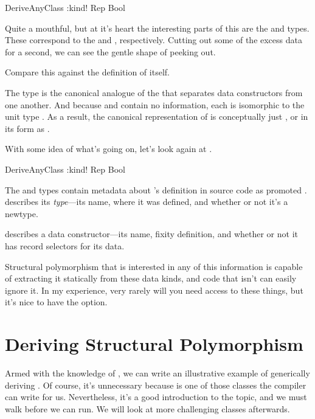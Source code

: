 \documentclass[book.tex]{subfiles}
\begin{document}
\begin{dorepl}{DeriveAnyClass}
:kind! Rep Bool
\end{dorepl}

Quite a mouthful, but at it's heart the interesting parts of this are the
\ty{(:+:)} and  types. These correspond to the  and
, respectively. Cutting out some of the excess data for a
second, we can see the gentle shape of  peeking out.


Compare this against the definition of  itself.


The \ty{(:+:)} type is the canonical analogue of the \hs{|} that separates data
constructors from one another. And because  and  contain no
information, each is isomorphic to the unit type \hs{()}. As a result, the
canonical representation of  is conceptually just , or
in its  form as .

With some idea of what's going on, let's look again at .

\begin{dorepl}{DeriveAnyClass}
:kind! Rep Bool
\end{dorepl}

The  and  types contain metadata about 's definition in
source code as promoted .  describes its \emph{type}---its
name, where it was defined, and whether or not it's a newtype.

 describes a data constructor---its name, fixity definition, and whether
or not it has record selectors for its data.

Structural polymorphism that is interested in any of this information is capable
of extracting it statically from these data kinds, and code that isn't can
easily ignore it. In my experience, very rarely will you need access to these
things, but it's nice to have the option.


\section{Deriving Structural Polymorphism}
\label{ghc.generics}


Armed with the knowledge of , we can write an illustrative example of
generically deriving . Of course, it's unnecessary because  is one
of those classes the compiler can write for us. Nevertheless, it's a good
introduction to the topic, and we must walk before we can run. We will look at
more challenging classes afterwards.
\end{document}
